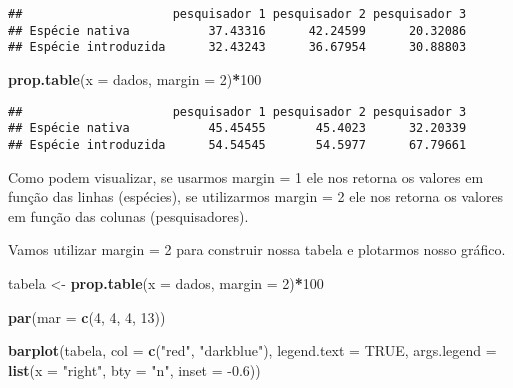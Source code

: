 \documentclass[]{book}
\newenvironment{Shaded}{\begin{snugshade}}{\end{snugshade}}
\newcommand{\DataTypeTok}[1]{\textcolor[rgb]{0.13,0.29,0.53}{#1}}
\newcommand{\DecValTok}[1]{\textcolor[rgb]{0.00,0.00,0.81}{#1}}
\newcommand{\FloatTok}[1]{\textcolor[rgb]{0.00,0.00,0.81}{#1}}
\newcommand{\KeywordTok}[1]{\textcolor[rgb]{0.13,0.29,0.53}{\textbf{#1}}}
\newcommand{\NormalTok}[1]{#1}
\newcommand{\OperatorTok}[1]{\textcolor[rgb]{0.81,0.36,0.00}{\textbf{#1}}}
\newcommand{\OtherTok}[1]{\textcolor[rgb]{0.56,0.35,0.01}{#1}}
\newcommand{\StringTok}[1]{\textcolor[rgb]{0.31,0.60,0.02}{#1}}
\begin{document}
\begin{verbatim}
##                     pesquisador 1 pesquisador 2 pesquisador 3
## Espécie nativa           37.43316      42.24599      20.32086
## Espécie introduzida      32.43243      36.67954      30.88803
\end{verbatim}

\begin{Shaded}
\begin{Highlighting}[]
\KeywordTok{prop.table}\NormalTok{(}\DataTypeTok{x =}\NormalTok{ dados, }\DataTypeTok{margin =} \DecValTok{2}\NormalTok{)}\OperatorTok{*}\DecValTok{100}
\end{Highlighting}
\end{Shaded}

\begin{verbatim}
##                     pesquisador 1 pesquisador 2 pesquisador 3
## Espécie nativa           45.45455       45.4023      32.20339
## Espécie introduzida      54.54545       54.5977      67.79661
\end{verbatim}

Como podem visualizar, se usarmos margin = 1 ele nos retorna os valores em função das linhas (espécies), se utilizarmos margin = 2 ele nos retorna os valores em função das colunas (pesquisadores).

Vamos utilizar margin = 2 para construir nossa tabela e plotarmos nosso gráfico.

\begin{Shaded}
\begin{Highlighting}[]
\NormalTok{tabela <-}\StringTok{ }\KeywordTok{prop.table}\NormalTok{(}\DataTypeTok{x =}\NormalTok{ dados, }\DataTypeTok{margin =} \DecValTok{2}\NormalTok{)}\OperatorTok{*}\DecValTok{100}

\KeywordTok{par}\NormalTok{(}\DataTypeTok{mar =} \KeywordTok{c}\NormalTok{(}\DecValTok{4}\NormalTok{, }\DecValTok{4}\NormalTok{, }\DecValTok{4}\NormalTok{, }\DecValTok{13}\NormalTok{))}

\KeywordTok{barplot}\NormalTok{(tabela, }
        \DataTypeTok{col =} \KeywordTok{c}\NormalTok{(}\StringTok{"red"}\NormalTok{, }\StringTok{"darkblue"}\NormalTok{), }
        \DataTypeTok{legend.text =} \OtherTok{TRUE}\NormalTok{, }
        \DataTypeTok{args.legend =} \KeywordTok{list}\NormalTok{(}\DataTypeTok{x =} \StringTok{"right"}\NormalTok{, }\DataTypeTok{bty =} \StringTok{"n"}\NormalTok{, }\DataTypeTok{inset =} \FloatTok{-0.6}\NormalTok{))}
\end{Highlighting}
\end{Shaded}
\end{document}
